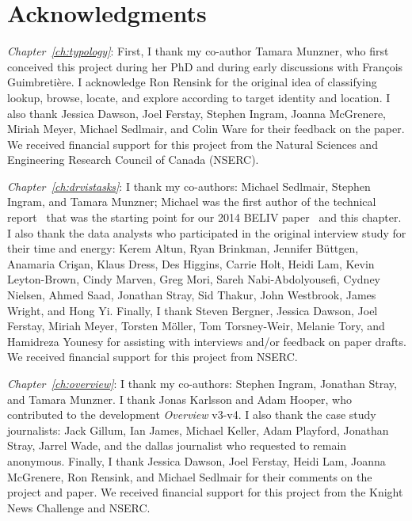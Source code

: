 
\chapter{Acknowledgments}


{\it Chapter~\ref{ch:typology}}: First, I thank my co-author Tamara Munzner, who first conceived this project during her PhD and during early discussions with Fran\c{c}ois Guimbreti\`ere. 
I acknowledge Ron Rensink for the original idea of classifying lookup, browse, locate, and explore according to target identity and location.
I also thank Jessica Dawson, Joel Ferstay, Stephen Ingram, Joanna McGrenere, Miriah Meyer, Michael Sedlmair, and Colin Ware for their feedback on the paper. 
We received financial support for this project from the Natural Sciences and Engineering Research Council of Canada (NSERC). 

{\it Chapter~\ref{ch:drvistasks}}: I thank my co-authors: Michael Sedlmair, Stephen Ingram, and Tamara Munzner; Michael was the first author of the technical report~\cite{Sedlmair2012b} that was the starting point for our 2014 \ac{BELIV} paper~\cite{Brehmer2014b} and this chapter.
I also thank the data analysts who participated in the original interview study for their time and energy: Kerem Altun, Ryan Brinkman, Jennifer B\"uttgen, Anamaria Cri\c{s}an, Klaus Dress, Des Higgins, Carrie Holt, Heidi Lam, Kevin Leyton-Brown, Cindy Marven, Greg Mori, Sareh Nabi-Abdolyousefi, Cydney Nielsen, Ahmed Saad, Jonathan Stray, Sid Thakur, John Westbrook, James Wright, and Hong Yi.
Finally, I thank Steven Bergner, Jessica Dawson, Joel Ferstay, Miriah Meyer, Torsten M\"oller, Tom Torsney-Weir, Melanie Tory, and Hamidreza Younesy for assisting with interviews and/or feedback on paper drafts.
We received financial support for this project from NSERC.

{\it Chapter~\ref{ch:overview}}: I thank my co-authors: Stephen Ingram, Jonathan Stray, and Tamara Munzner. 
I thank Jonas Karlsson and Adam Hooper, who contributed to the development {\it Overview} v3-v4. 
I also thank the case study journalists: Jack Gillum, Ian James, Michael Keller, Adam Playford, Jonathan Stray, Jarrel Wade, and the {\sc dallas} journalist who requested to remain anonymous. 
Finally, I thank Jessica Dawson, Joel Ferstay, Heidi Lam, Joanna McGrenere, Ron Rensink, and Michael Sedlmair for their comments on the project and paper.
We received financial support for this project from the Knight News Challenge and NSERC. 

